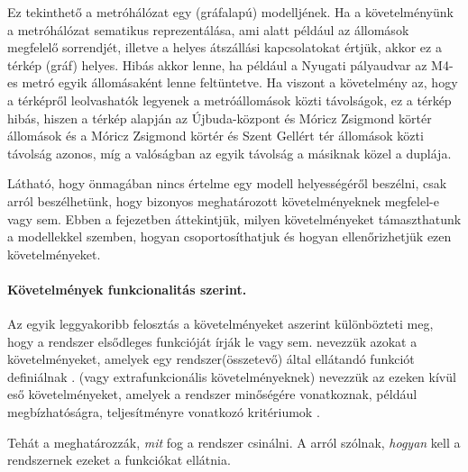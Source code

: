 \begin{pelda}
	Ez tekinthető a metróhálózat egy (gráfalapú) modelljének. Ha a követelményünk a metróhálózat sematikus reprezentálása, ami alatt például az állomások megfelelő sorrendjét, illetve a helyes átszállási kapcsolatokat értjük, akkor ez a térkép (gráf) helyes. Hibás akkor lenne, ha például a Nyugati pályaudvar az M4-es metró egyik állomásaként lenne feltüntetve. Ha viszont a követelmény az, hogy a térképről leolvashatók legyenek a metróállomások közti távolságok, ez a térkép hibás, hiszen a térkép alapján az Újbuda-központ és Móricz Zsigmond körtér állomások és a Móricz Zsigmond körtér és Szent Gellért tér állomások közti távolság azonos, míg a valóságban az egyik távolság a másiknak közel a duplája. 
\end{pelda}

Látható, hogy önmagában nincs értelme egy modell helyességéről beszélni, csak arról beszélhetünk, hogy bizonyos meghatározott követelményeknek megfelel-e vagy sem.
Ebben a fejezetben áttekintjük, milyen követelményeket támaszthatunk a modellekkel szemben, hogyan csoportosíthatjuk és hogyan ellenőrizhetjük ezen követelményeket.

\paragraph{Követelmények funkcionalitás szerint.}
Az egyik leggyakoribb felosztás a követelményeket aszerint különbözteti meg, hogy a rendszer elsődleges funkcióját írják le vagy sem.  nevezzük azokat a követelményeket, amelyek egy rendszer(összetevő) által ellátandó funkciót definiálnak \cite{IEEE-24765}.
 (vagy extrafunkcionális követelményeknek) nevezzük az ezeken kívül eső követelményeket, amelyek a rendszer minőségére vonatkoznak, például megbízhatóságra, teljesítményre vonatkozó kritériumok \cite{IEEE-24765}.

\begin{megjegyzes}
Tehát a  meghatározzák, \emph{mit} fog a rendszer csinálni. A  arról szólnak, \emph{hogyan} kell a rendszernek ezeket a funkciókat ellátnia.
\end{megjegyzes}

